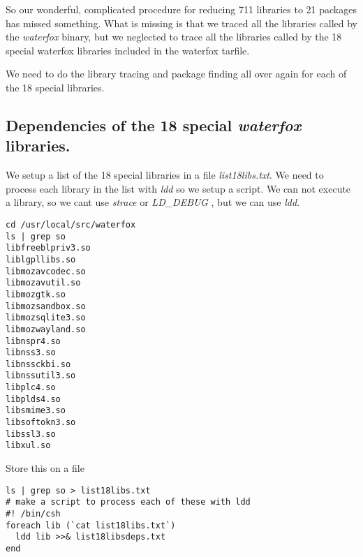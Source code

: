 \documentclass{article}  %
\begin{document}
So our wonderful, complicated procedure for reducing 711 libraries to 21 packages has missed something. What is missing is that we traced all the libraries called by the {\em waterfox} binary, but we neglected to trace all the libraries called by the 18 special waterfox libraries included in the waterfox tarfile. 

We need to do the library tracing and package finding all over again for each of the 18 special libraries. 

\subsection{Dependencies of the 18 special {\em waterfox} libraries.}
We setup a list of the 18 special libraries in a file {\em list18libs.txt}. We need to process each library in the list with {\em ldd} so we setup a script. We can not execute a library, so we cant use {\em strace} or {\em LD\_DEBUG} , but we can use {\em ldd}.
\begin{verbatim}
cd /usr/local/src/waterfox
ls | grep so 
libfreeblpriv3.so
liblgpllibs.so
libmozavcodec.so
libmozavutil.so
libmozgtk.so
libmozsandbox.so
libmozsqlite3.so
libmozwayland.so
libnspr4.so
libnss3.so
libnssckbi.so
libnssutil3.so
libplc4.so
libplds4.so
libsmime3.so
libsoftokn3.so
libssl3.so
libxul.so
\end{verbatim}

 Store this on a file
\begin{lstlisting}
ls | grep so > list18libs.txt
# make a script to process each of these with ldd
#! /bin/csh
foreach lib (`cat list18libs.txt`)
  ldd lib >>& list18libsdeps.txt
end
\end{lstlisting}
\end{document}

